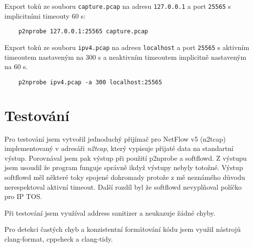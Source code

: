 \documentclass{article}
\begin{document}
Export toků ze souboru \verb|capture.pcap| na adresu \verb|127.0.0.1| a port
\verb|25565| s implicitními timeouty 60 s:
\begin{verbatim}
    p2nprobe 127.0.0.1:25565 capture.pcap
\end{verbatim}

Export toků ze souboru \verb|ipv4.pcap| na adresu \verb|localhost| a port
\verb|25565| s aktivním timeoutem nastaveným na 300 s a neaktivním timeoutem
implicitně nastaveným na 60 s.
\begin{verbatim}
    p2nprobe ipv4.pcap -a 300 localhost:25565
\end{verbatim}

\section{Testování}
Pro testování jsem vytvořil jednoduchý přijímač pro NetFlow v5 (n2tcap)
implementovaný v adresáři \textit{n2tcap}, který vypisuje přijaté data na
standartní výstup. Porovnával jsem pak výstup při použití p2nprobe a softflowd.
Z výstupu jsem usoudil že program funguje správně ikdyž výstupy nebyly totožné.
Výstup softflowd měl některé toky spojené dohromady protože z mě neznámého
důvodu nerespektoval aktivní timeout. Další rozdíl byl že softflowd nevyplňoval
políčko pro IP TOS.

Při testování jsem využíval address sanitizer a neukazuje žádné chyby.

Pro detekci častých chyb a konzistentní formátování kódu jsem využil nástrojů
clang-format, cppcheck a clang-tidy.
\end{document}
